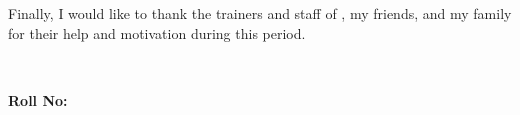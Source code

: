 Finally, I would like to thank the trainers and staff of \CompanyName, my friends, and my family for their help and motivation during this period.

\vspace{26.7pt}
{\bfseries\fontsize{12}{14.5}\selectfont \ReportAuthor\par}
{\bfseries\fontsize{12}{14.5}\selectfont \ProgramName\ \SemesterName\par}
{\bfseries\fontsize{12}{14.5}\selectfont Roll No: \SymbolNumber\par}
{\bfseries\fontsize{12}{14.5}\selectfont \CampusFullName\par}
